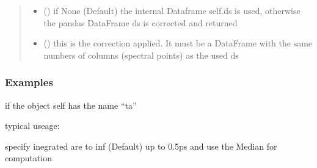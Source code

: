 \documentclass[letterpaper,10pt,english]{sphinxmanual}
\begin{document}
\begin{fulllineitems}
\begin{fulllineitems}
\begin{quote}
\begin{description}
\begin{itemize}
\item {} 
 (\sphinxstyleliteralemphasis{\sphinxupquote{, }}) \textendash{} if None (Default) the internal Dataframe self.ds is used,
otherwise the pandas DataFrame ds is corrected and returned

\item {} 
 (\sphinxstyleliteralemphasis{\sphinxupquote{, }}) \textendash{} this is the correction applied. It must be a DataFrame with
the same numbers of columns (spectral points) as the used ds

\end{itemize}

\end{description}\end{quote}
\subsubsection*{Examples}

if the object self has the name “ta”

typical useage:

\begin{sphinxVerbatim}[commandchars=\\\{\}]
\end{sphinxVerbatim}

specify inegrated are to \sphinxhyphen{} inf (Default) up to \sphinxhyphen{}0.5ps and use the Median for computation

\begin{sphinxVerbatim}[commandchars=\\\{\}]
     
\end{sphinxVerbatim}

\end{fulllineitems}


\end{fulllineitems}
\end{document}

